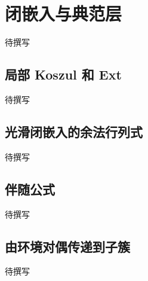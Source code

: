 
% 
% 

\section{闭嵌入与典范层}
\label{g5:sec:2202}

待撰写

\subsection{局部 Koszul 和 Ext}
\label{g5:subsec:2202:01}
待撰写

\subsection{光滑闭嵌入的余法行列式}
\label{g5:subsec:2202:02}
待撰写

\subsection{伴随公式}
\label{g5:subsec:2202:03}
待撰写

\subsection{由环境对偶传递到子簇}
\label{g5:subsec:2202:04}
待撰写
